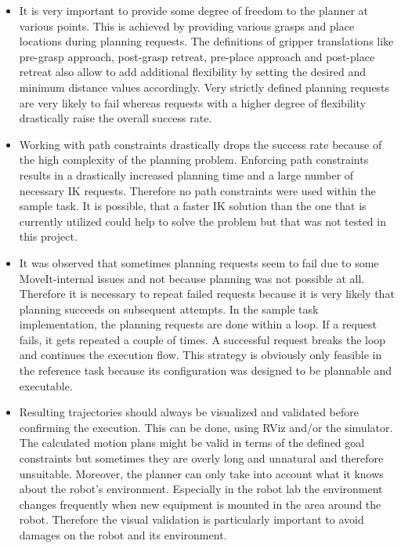\begin{itemize}

\item

It is very important to provide some degree of freedom to the planner at various points. This is achieved by providing various grasps and place locations during planning requests. The definitions of gripper translations like pre-grasp approach, post-grasp retreat, pre-place approach and post-place retreat also allow to add additional flexibility by setting the desired and minimum distance values accordingly. Very strictly defined planning requests are very likely to fail whereas requests with a higher degree of flexibility drastically raise the overall success rate.

\item

Working with path constraints drastically drops the success rate because of the high complexity of the planning problem. Enforcing path constraints results in a drastically increased planning time and a large number of necessary IK requests. Therefore no path constraints were used within the sample task. It is possible, that a faster IK solution than the one that is currently utilized could help to solve the problem but that was not tested in this project.

\item

It was observed that sometimes planning requests seem to fail due to some MoveIt-internal issues and not because planning was not possible at all. Therefore it is necessary to repeat failed requests because it is very likely that planning succeeds on subsequent attempts. In the sample task implementation, the planning requests are done within a loop. If a request fails, it gets repeated a couple of times. A successful request breaks the loop and continues the execution flow. This strategy is obviously only feasible in the reference task because its configuration was designed to be plannable and executable.

\item

Resulting trajectories should always be visualized and validated before confirming the execution. This can be done, using RViz and/or the simulator. The calculated motion plans might be valid in terms of the defined goal constraints but sometimes they are overly long and unnatural and therefore unsuitable. Moreover, the planner can only take into account what it knows about the robot's environment. Especially in the robot lab the environment changes frequently when new equipment is mounted in the area around the robot. Therefore the visual validation is particularly important to avoid damages on the robot and its environment.

\end{itemize}


